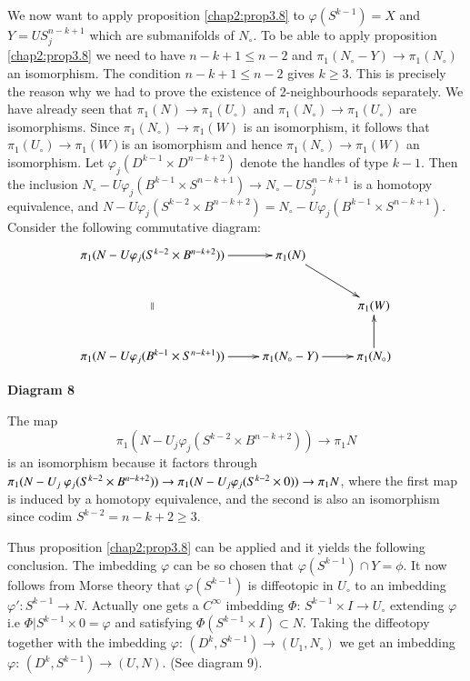 We now want to apply proposition \ref{chap2:prop3.8} to $\varphi (S^{k-1})=X$ and $Y=
US_j ^{n-k+1}$ which are submanifolds of $N_\circ$. To be able to apply
proposition \ref{chap2:prop3.8} we need to have $n-k+1 \leq n-2$ and $\pi_1 (N_\circ-Y)
\to \pi_1 (N_\circ)$ an isomorphism. The condition $n-k+1 \leq n-2$ gives
$k \geq 3$. This is precisely the reason why we had to prove the
existence of 2-neighbourhoods separately. We have already seen that
$\pi_1 (N) \to \pi_1 (U_\circ) $ and $\pi_1 (N_\circ) \to \pi_1 (U_\circ)$ are
isomorphisms. Since $\pi_1 (N_\circ) \to \pi_1 (W)$ is an isomorphism, it
follows that $\pi_1 (U_\circ) \to \pi_1 (W)$is an isomorphism and hence
$\pi_1 (N_\circ) \to \pi_1 (W)$ an isomorphism. Let $\varphi_j (D^{k-1}
\times D^{n-k+2})$ denote the handles of type $k-1$. Then the
inclusion $N_\circ -U \varphi _j(B^{k-1} \times S^{n-k+1}) \to N_\circ-
US_j^{n-k+1}$ is a homotopy equivalence, and $N - U \varphi_j (S^{k-2}
\times B^{n-k+2})=N_\circ -U\varphi_j (B^{k-1} \times
  S^{n-k+1})$. Consider the following commutative diagram:  
\[
\xymatrix{
\pi_1 (N - U \varphi_j (S^{k-2} \times B^{n-k+2})) \ar[r]\ar@{}[dd]|{||} & 
\pi_1 (N) \ar[dr] & \\
& &  \pi_1 (W)  \\
\pi_1 (N - U \varphi_j (B^{k-1} \times S^{n-k+1})) \ar[r] & \pi_1
(N_\circ - Y) \ar[r] &  \pi_1 (N_\circ) \ar[u] 
}
\]
\begin{center}
{\bf Diagram 8}
\end{center}

The map\pageoriginale
$$
\pi_1 (N-U_j \varphi_j (S^{k-2} \times B^{n-k+2})) \to \pi_1 N 
$$
is an isomorphism because it factors through $\pi_1 (N- U_j \ \varphi
_j (S^{k-2} \times\break B^{n-k+2})) \to \pi_1 (N-U_j \varphi_j (S^{k-2} \times
0)) \to \pi_1 N$, where the first map is induced by a homotopy
equivalence, and the second is also an isomorphism since codim
$S^{k-2}= n-k+2 \geq 3$. 

Thus proposition \ref{chap2:prop3.8} can be applied and it yields the following
conclusion. The imbedding $\varphi$ can be so chosen that
$\varphi(S^{k-1}) \cap Y= \phi$. It now follows from Morse theory that
$\varphi (S^{k-1})$ is diffeotopic in $U_\circ$ to an imbedding $\varphi'
: S^{k-1} \to N$. Actually one gets a $C^ \infty$ imbedding $\Phi$:
$S^{k-1}\times I \to U_\circ$ extending $\varphi$ i.e $\Phi | S^{k-1} \times
0= \varphi$ and satisfying $\Phi (S^{k-1} \times I) \subset N$. Taking
the diffeotopy together with the imbedding $\varphi$: $(D^k, S^{k-1})
\to (U_1, N_\circ)$ we get an imbedding $\varphi$: $(D^k, S^{k-1}) \to (U,
N)$. (See diagram 9). 

